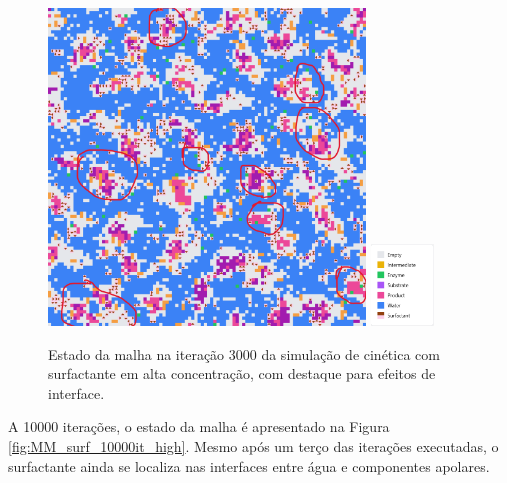\documentclass[12pt,oneside]{report}
\begin{document}
\begin{figure}[H]
    \centering
    \includegraphics[width=0.75\textwidth]{img/surf_3000_high.png}
    \hspace{0.05\textwidth}
    \includegraphics[width=0.15\textwidth]{img/legend_surf.png}
    \caption{\small Estado da malha na iteração 3000 da simulação de cinética com surfactante em alta concentração, com destaque para efeitos de interface.}
    \label{fig:MM_surf_3000it_high}
\end{figure}

A 10000 iterações, o estado da malha é apresentado na Figura \ref{fig:MM_surf_10000it_high}. Mesmo após um terço das iterações executadas, o surfactante ainda se localiza nas interfaces entre água e componentes apolares.
\end{document}
